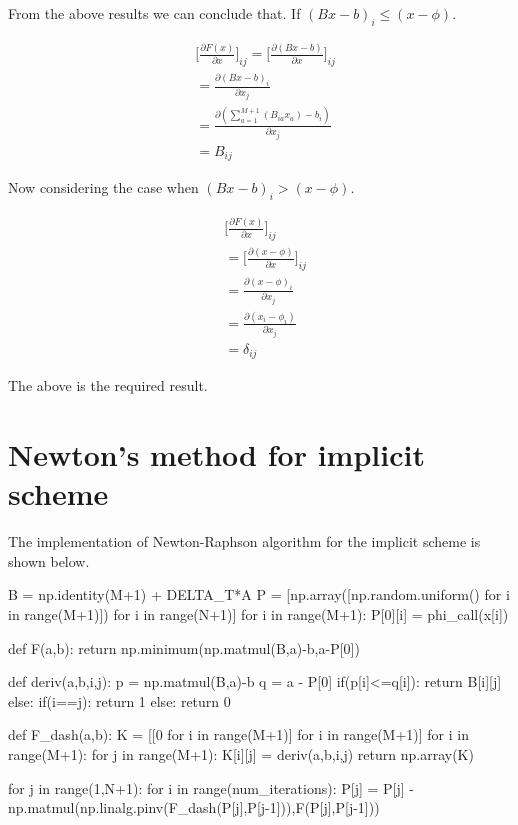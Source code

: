 \documentclass[12pt]{report}
\begin{document}
From the above results we can conclude that. If $(Bx-b)_i \leq (x-\phi)$.

\begin{equation*}
	\begin{aligned}
		& \Bigg[\frac{\partial F(x)}{\partial x} \Bigg]_{ij} = \Bigg[\frac{\partial (Bx-b)}{\partial x} \Bigg]_{ij} \\
		&= \frac{\partial (Bx-b)_i}{\partial x_j} \\
		&= \frac{\partial (\sum_{a=1}^{M+1}(B_{ia}x_a)-b_i)}{\partial x_j}\\
		&=B_{ij}
	\end{aligned}
\end{equation*}

Now considering the case when   $(Bx-b)_i > (x-\phi)$.

\begin{equation*}
	\begin{aligned}
		&\Bigg[\frac{\partial F(x)}{\partial x} \Bigg]_{ij} \\
		&= \bigg[\frac{\partial (x-\phi)}{\partial x}\bigg]_{ij} \\
		&= \frac{\partial (x-\phi)_i}{\partial x_j} \\
		&= \frac{\partial (x_i-\phi_i)}{\partial x_j} \\
		&= \delta_{ij}
	\end{aligned}
\end{equation*}

The above is the required result.

\section*{Newton's method for implicit scheme}

The implementation of Newton-Raphson algorithm for the implicit scheme is shown below.
\linebreak
\begin{python}
B = np.identity(M+1) + DELTA_T*A
P = [np.array([np.random.uniform() for i in range(M+1)]) for i in range(N+1)]
for i in range(M+1):
 P[0][i] = phi_call(x[i])

def F(a,b):
 return np.minimum(np.matmul(B,a)-b,a-P[0])

def deriv(a,b,i,j):
 p = np.matmul(B,a)-b
 q = a - P[0]
 if(p[i]<=q[i]):
  return B[i][j]
 else:
  if(i==j):
   return 1
  else:
   return 0

def F_dash(a,b):
 K = [[0 for i in range(M+1)] for i in range(M+1)]
 for i in range(M+1):
  for j in range(M+1):
   K[i][j] = deriv(a,b,i,j)
 return np.array(K)

for j in range(1,N+1):
 for i in range(num_iterations):
  P[j] = P[j] - np.matmul(np.linalg.pinv(F_dash(P[j],P[j-1])),F(P[j],P[j-1]))

\end{python}
\end{document}

